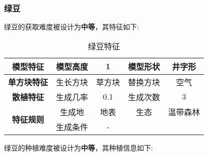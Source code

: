 \subsubsection{绿豆}

绿豆的获取难度被设计为\textbf{中等}，其特征如下:
\begin{table}[H]
    \centering
    \caption{绿豆特征}
    \label{table:绿豆特征}
    \setlength{\tabcolsep}{4mm}
    \begin{tabular}{c|cc|cc}
        \toprule
        \textbf{模型特征}                  & 模型高度 & 1      & 模型形状 & 井字形 \\
        \midrule
        \textbf{单方块特征}                & 生长方块 & 草方块 & 替换方块 & 空气   \\
        \midrule
        \textbf{散植特征}                  & 生成几率 & 0.1    & 生成次数 & 3      \\
        \midrule
        \multirow{2}{*}{\textbf{特征规则}} & 生成地   & 地表   & 生态     & 温带森林   \\
                                           & 生成条件 & -              \\
        \bottomrule
    \end{tabular}
\end{table}


绿豆的种植难度被设计为\textbf{中等}，其种植信息如下:

